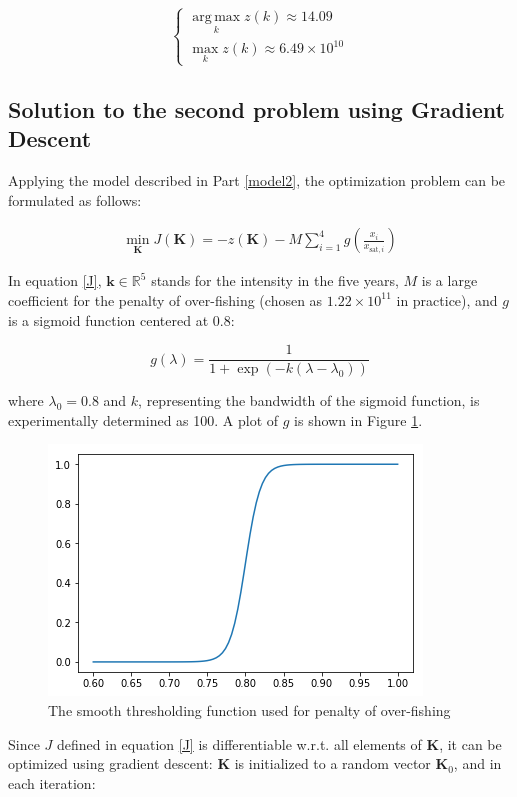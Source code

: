 \documentclass{IEEEtran}
\DeclareMathOperator*{\argmax}{arg\,max}
\begin{document}
$$\begin{cases}\argmax\limits_k z(k) \approx 14.09\\\max\limits_k z(k) \approx 6.49\times 10^{10} \end{cases}$$

\subsection{Solution to the second problem using Gradient Descent}

Applying the model described in Part \ref{model2}, the optimization problem can be formulated as follows:

\begin{equation}\begin{aligned}
	\label{J}
	\min\limits_{ \boldsymbol{K}} J(\boldsymbol{K}) = -z( \boldsymbol{K}) - M \sum\limits_{i=1}^4 g(\frac{x_i}{x_{ \mathrm{sat}, i}})
\end{aligned}\end{equation}

In equation \ref{J}, $\boldsymbol{k}\in \mathbb{R}^5$ stands for the intensity in the five years, $M$ is a large coefficient for the penalty of over-fishing (chosen as $1.22\times 10^{11}$ in practice), and $g$ is a sigmoid function centered at 0.8:

$$g(\lambda) = \frac1{1+ \exp(-k(\lambda - \lambda_0))}$$

where $\lambda_0 = 0.8$ and $k$, representing the bandwidth of the sigmoid function, is experimentally determined as 100. A plot of $g$ is shown in Figure \ref{g}.

\begin{figure}[h]
	\centering
	\includegraphics[width=0.6\columnwidth]{g}
	\caption{The smooth thresholding function used for penalty of over-fishing\label{g}}
\end{figure}

Since $J$ defined in equation \ref{J} is differentiable w.r.t. all elements of $\boldsymbol{K}$, it can be optimized using gradient descent: $\boldsymbol{K}$ is initialized to a random vector $\boldsymbol{K}_0$, and in each iteration:
\end{document}
